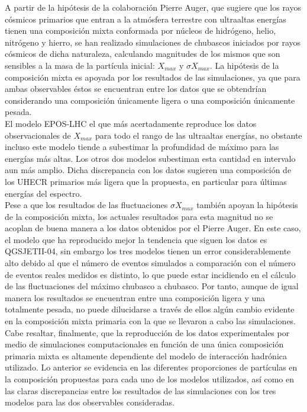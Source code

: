 
A partir de la hipótesis de la colaboración Pierre Auger, que sugiere que los rayos cósmicos primarios que entran a la atmósfera terrestre con ultraaltas energías tienen una composición mixta conformada por núcleos de hidrógeno, helio, nitrógeno y hierro, se han realizado simulaciones de chubascos iniciados por rayos cósmicos de dicha naturaleza, calculando magnitudes de los mismos que son sensibles a la masa de la partícula inicial: $X_{max}$ y $\sigma X_{max}$. La hipótesis de la composición mixta es apoyada por los resultados de las simulaciones, ya que para ambas observables éstos se encuentran entre los datos que se obtendrían considerando una composición únicamente ligera o una composición únicamente pesada. \\

El modelo EPOS-LHC el que más acertadamente reproduce los datos observacionales de $X_{max}$ para todo el rango de las ultraaltas energías, no obstante incluso este modelo tiende a subestimar la profundidad de máximo para las energías más altas. Los otros dos modelos subestiman esta cantidad en intervalo aun más amplio. Dicha discrepancia con los datos sugieren una composición de los UHECR primarios más ligera que la propuesta, en particular para últimas energías del espectro. \\

Pese a que los resultados de las fluctuaciones $\sigma X_{max}$ también apoyan la hipótesis de la composición mixta, los actuales resultados para esta magnitud no se acoplan de buena manera a los datos obtenidos por el Pierre Auger. En este caso, el modelo que ha reproducido mejor la tendencia que siguen los datos es QGSJETII-04, sin embargo los tres modelos tienen un error considerablemente alto debido al que el número de eventos simulados a comparación con el número de eventos reales medidos es distinto, lo que puede estar incidiendo en el cálculo de las fluctuaciones del máximo chubasco a chubasco. Por tanto, aunque de igual manera los resultados se encuentran entre una composición ligera y una totalmente pesada, no puede dilucidarse a través de ellos algún cambio evidente en la composición mixta primaria con la que se llevaron a cabo las simulaciones. \\

Cabe resaltar, finalmente, que la reproducción de los datos experimentales por medio de simulaciones computacionales en función de una única composición primaria mixta es altamente dependiente del modelo de interacción hadrónica utilizado. Lo anterior se evidencia en las diferentes proporciones de partículas en la composición propuestas para cada uno de los modelos utilizados, así como en las claras discrepancias entre los resultados de las simulaciones con los tres modelos para las dos observables consideradas. \\

